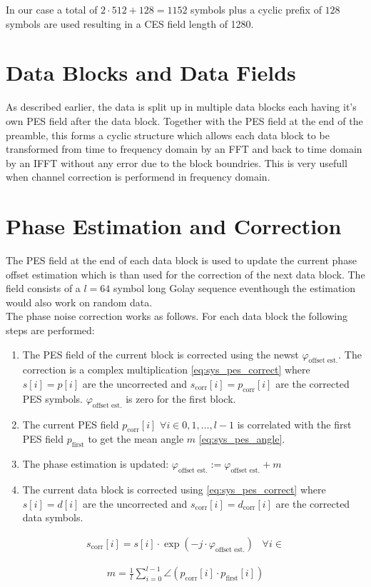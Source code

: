 In our case a total of $2 \cdot 512 + 128 = 1152$ symbols plus
a cyclic prefix of $128$ symbols are used resulting in a \gls{CES} field
length of 1280.

\section{Data Blocks and Data Fields}
As described earlier, the data is split up in multiple data blocks
each having it's own \gls{PES} field after the data block.
Together with the \gls{PES} field at the end of the preamble, this forms
a cyclic structure which allows each data block to be transformed
from time to frequency domain by an \gls{FFT} and back to time domain
by an \gls{IFFT} without any error due to the block boundries.
This is very usefull when channel correction is performend in frequency domain.

\section{Phase Estimation and Correction}
The \gls{PES} field at the end of each data block is used to update
the current phase offset estimation which is than used for the correction
of the next data block. The field consists of a $l=64$ symbol long Golay
sequence eventhough the estimation would also work on random data. \\

The phase noise correction works as follows. For each data block
the following steps are performed:

\begin{enumerate}
\item The \gls{PES} field of the current block is corrected
  using the newst $\varphi_{\text{offset est.}}$.
  The correction is a complex multiplication \eqref{eq:sys_pes_correct}
  where $s[i] = p[i]$ are the uncorrected and
  $s_{\text{corr}}[i] = p_{\text{corr}}[i]$ are the corrected \gls{PES} symbols.
  $\varphi_{\text{offset est.}}$ is zero for the first block.
\item The current \gls{PES} field $p_{\text{corr}}[i] $
  $\forall i \in {0, 1, \dots, l-1}$
  is correlated with the first \gls{PES} field $p_{\text{first}}$
  to get the mean angle $m$ \eqref{eq:sys_pes_angle}.
\item The phase estimation is updated:
  $\varphi_{\text{offset est.}} := \varphi_{\text{offset est.}} + m$
\item The current data block is corrected using \eqref{eq:sys_pes_correct}
  where $s[i] = d[i]$ are the uncorrected and
  $s_{\text{corr}}[i] = d_{\text{corr}}[i]$ are the corrected data symbols.
\end{enumerate}

\begin{align}
  \label{eq:sys_pes_correct}
  s_{\text{corr}}[i] = s[i] \cdot \exp(-j \cdot \varphi_{\text{offset est.}})
  \;\;\; \forall i \in
\end{align}

\begin{align}
  \label{eq:sys_pes_angle}
  m = \frac{1}{l}
  \sum_{i=0}^{l-1} \angle(p_{\text{corr}}[i] \cdot p_{\text{first}}[i])
\end{align}
